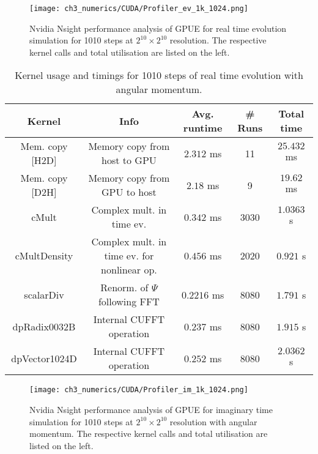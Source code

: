 \begin{figure}
    \centering
    \texttt{[image: ch3\_numerics/CUDA/Profiler\_ev\_1k\_1024.png]}
    \caption{Nvidia Nsight performance analysis of GPUE for real time evolution simulation for 1010 steps at $2^{10}\times 2^{10}$ resolution. The respective kernel calls and total utilisation are listed on the left.}
    \label{fig:profile_ev}
\end{figure}

\begin{table}
    \scriptsize
    \centering
\begin{tabular}{c|c|c|c|c}
\textbf{Kernel}  & \textbf{Info} & \textbf{Avg. runtime} & \textbf{\# Runs} & \textbf{Total time} \\
\hline
Mem. copy [H2D] & Memory copy from host to GPU & $2.312$ ms & 11 & $25.432$ ms\\
Mem. copy [D2H] & Memory copy from GPU to host & $2.18$ ms & 9 & $19.62$ ms\\
cMult & Complex mult. in time ev. & $0.342$ ms & 3030 & $1.0363$ s\\
cMultDensity & Complex mult. in time ev. for nonlinear op. & $0.456$ ms & 2020 & $0.921$ s \\
scalarDiv & Renorm. of $\Psi$ following FFT & $0.2216$ ms & 8080 & $1.791$ s\\
dpRadix0032B & Internal CUFFT operation & $0.237$ ms & 8080 & $1.915$ s\\
dpVector1024D & Internal CUFFT operation & $0.252$ ms & 8080 & $2.0362$ s\\
\end{tabular}
\caption{Kernel usage and timings for 1010 steps of real time evolution with angular momentum.}\label{tbl:gpue_ev}
\end{table}

\begin{figure}
    \centering
    \texttt{[image: ch3\_numerics/CUDA/Profiler\_im\_1k\_1024.png]}
    \caption{Nvidia Nsight performance analysis of GPUE for imaginary time simulation for 1010 steps at $2^{10}\times 2^{10}$ resolution with angular momentum. The respective kernel calls and total utilisation are listed on the left.}
    \label{fig:profile_im}
\end{figure}

